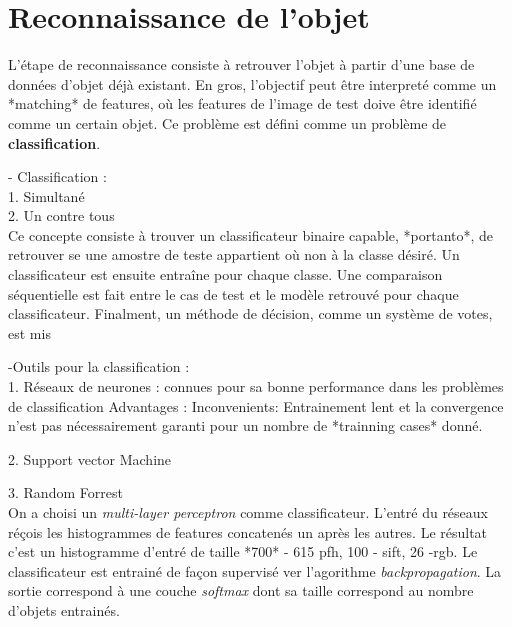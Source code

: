 \chapter{Reconnaissance de l'objet}

L'étape de reconnaissance consiste à retrouver l'objet à partir d'une base de données  d'objet déjà existant. En gros,  l'objectif peut être interpreté comme un *matching* de features, où les features de l'image de test doive être identifié comme un certain objet. Ce problème est défini comme un problème de \textbf{classification}.

- Classification : \\
1. Simultané \\
2. Un contre tous \\
Ce concepte consiste à trouver un classificateur binaire capable, *portanto*, de retrouver se une amostre de teste appartient où non à la classe désiré. Un classificateur est ensuite entraîne pour chaque classe. Une comparaison séquentielle est fait entre le cas de test et le modèle retrouvé pour chaque classificateur. Finalment, un méthode de décision, comme un système de votes, est mis 

-Outils pour la classification : \\

1. Réseaux de neurones : connues pour sa bonne performance dans les problèmes de classification
Advantages : 
Inconvenients: Entrainement lent et la convergence n'est pas nécessairement garanti pour un nombre de *trainning cases* donné.

2. Support vector Machine

3. Random Forrest \\

On a choisi un \textit{multi-layer perceptron} comme classificateur. L'entré du réseaux réçois les histogrammes de features concatenés un après les autres. Le résultat c'est un histogramme d'entré de taille *700* - 615 pfh, 100 - sift, 26 -rgb. Le classificateur est entrainé de façon supervisé ver l'agorithme \textit{backpropagation}. La sortie correspond à une couche \textit{softmax} dont sa taille correspond au nombre d'objets entrainés.
